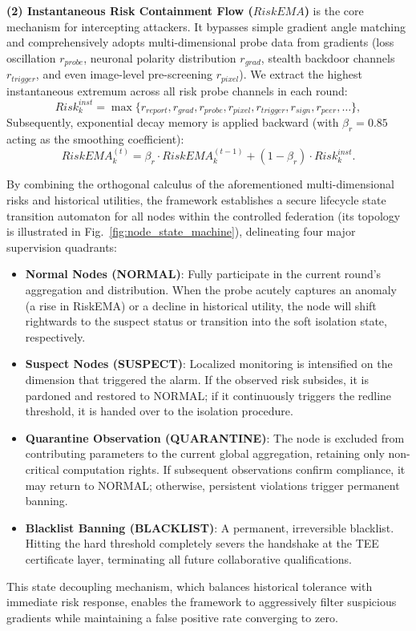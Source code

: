 \documentclass[runningheads]{llncs}
\begin{document}
\textbf{(2) Instantaneous Risk Containment Flow ($RiskEMA$)} is the core mechanism for intercepting attackers. It bypasses simple gradient angle matching and comprehensively adopts multi-dimensional probe data from gradients (loss oscillation $r_{probe}$, neuronal polarity distribution $r_{grad}$, stealth backdoor channels $r_{trigger}$, and even image-level pre-screening $r_{pixel}$). We extract the highest instantaneous extremum across all risk probe channels in each round:
\begin{equation}
    Risk_{k}^{inst} = \max\{r_{report}, r_{grad}, r_{probe}, r_{pixel}, r_{trigger}, r_{sign}, r_{peer}, \dots \},
\end{equation}
Subsequently, exponential decay memory is applied backward (with $\beta_r = 0.85$ acting as the smoothing coefficient):
\begin{equation}
    RiskEMA_{k}^{(t)} = \beta_{r} \cdot RiskEMA_{k}^{(t-1)} + (1 - \beta_{r}) \cdot Risk_{k}^{inst}.
\end{equation}

By combining the orthogonal calculus of the aforementioned multi-dimensional risks and historical utilities, the framework establishes a secure lifecycle state transition automaton for all nodes within the controlled federation (its topology is illustrated in Fig.~\ref{fig:node_state_machine}), delineating four major supervision quadrants:
\begin{itemize}
    \item \textbf{Normal Nodes (NORMAL)}: Fully participate in the current round's aggregation and distribution. When the probe acutely captures an anomaly (a rise in RiskEMA) or a decline in historical utility, the node will shift rightwards to the suspect status or transition into the soft isolation state, respectively.
    \item \textbf{Suspect Nodes (SUSPECT)}: Localized monitoring is intensified on the dimension that triggered the alarm. If the observed risk subsides, it is pardoned and restored to NORMAL; if it continuously triggers the redline threshold, it is handed over to the isolation procedure.
    \item \textbf{Quarantine Observation (QUARANTINE)}: The node is excluded from contributing parameters to the current global aggregation, retaining only non-critical computation rights. If subsequent observations confirm compliance, it may return to NORMAL; otherwise, persistent violations trigger permanent banning.
    \item \textbf{Blacklist Banning (BLACKLIST)}: A permanent, irreversible blacklist. Hitting the hard threshold completely severs the handshake at the TEE certificate layer, terminating all future collaborative qualifications.
\end{itemize}
This state decoupling mechanism, which balances historical tolerance with immediate risk response, enables the framework to aggressively filter suspicious gradients while maintaining a false positive rate converging to zero.
\end{document}
